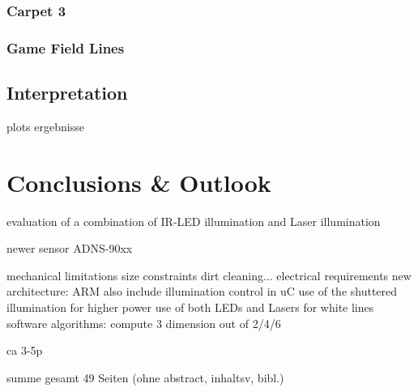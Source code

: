 \documentclass[12pt,a4paper]{article}
\begin{document}
\subsubsection{Carpet 3}

\subsubsection{Game Field Lines}

\subsection{Interpretation}

  plots
  ergebnisse

\section{Conclusions \& Outlook}

  evaluation of a combination of IR-LED illumination and Laser illumination

  newer sensor ADNS-90xx

  mechanical limitations
    size constraints
    dirt cleaning...
  electrical requirements
    new architecture: ARM
    also include illumination control in uC
      use of the shuttered illumination for higher power 
      use of both LEDs and Lasers for white lines
  software algorithms: compute 3 dimension out of 2/4/6

ca 3-5p


summe gesamt 49 Seiten (ohne abstract, inhaltsv, bibl.)


\label{Bibliography}


%
\end{document}
